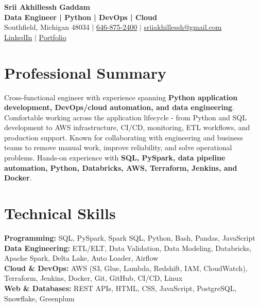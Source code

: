 \documentclass[letterpaper,10pt]{article}
\begin{document}
\fontsize{9.35pt}{10.45pt}\selectfont

\begin{center}
    {\LARGE \textbf{Srii Akhillessh Gaddam}} \\[-1pt]
    \textbf{Data Engineer | Python | DevOps | Cloud} \\[2pt]
    Southfield, Michigan 48034 $|$
    \href{tel:6468752400}{646-875-2400} $|$
    \href{mailto:sriiakhillessh@gmail.com}{sriiakhillessh@gmail.com} \\[1pt]
    \href{https://www.linkedin.com/in/srii-akhiilessh-gaddam-b48668191/}{LinkedIn} $|$
    \href{https://sriiakhillesshg.github.io/portfolio/}{Portfolio}
\end{center}
\vspace{-8pt}

\section{Professional Summary}
\small{Cross-functional engineer with experience spanning \textbf{Python application development, DevOps/cloud automation, and data engineering}. Comfortable working across the application lifecycle - from Python and SQL development to AWS infrastructure, CI/CD, monitoring, ETL workflows, and production support. Known for collaborating with engineering and business teams to remove manual work, improve reliability, and solve operational problems. Hands-on experience with \textbf{SQL, PySpark, data pipeline automation, Python, Databricks, AWS, Terraform, Jenkins, and Docker}.}

\section{Technical Skills}
\small{
\textbf{Programming:} SQL, PySpark, Spark SQL, Python, Bash, Pandas, JavaScript \\
\textbf{Data Engineering:} ETL/ELT, Data Validation, Data Modeling, Databricks, Apache Spark, Delta Lake, Auto Loader, Airflow \\
\textbf{Cloud \& DevOps:} AWS (S3, Glue, Lambda, Redshift, IAM, CloudWatch), Terraform, Jenkins, Docker, Git, GitHub, CI/CD, Linux \\
\textbf{Web \& Databases:} REST APIs, HTML, CSS, JavaScript, PostgreSQL, Snowflake, Greenplum
}

\end{document}
